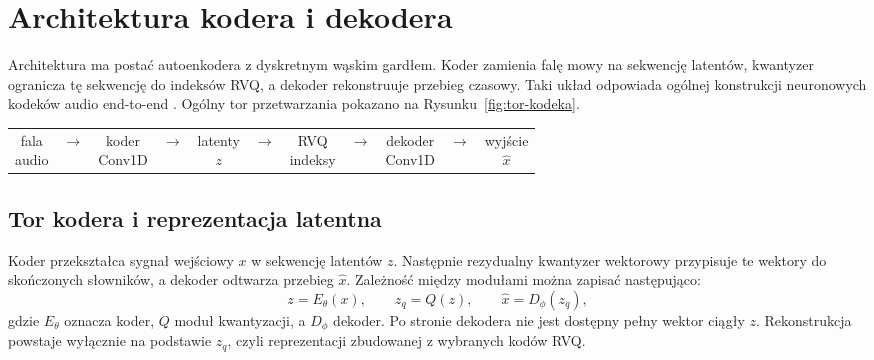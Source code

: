 \section{Architektura kodera i dekodera}
\label{sec:architektura-kodera-dekodera}

Architektura ma postać autoenkodera z dyskretnym wąskim gardłem. Koder zamienia falę mowy na sekwencję latentów, kwantyzer ogranicza tę sekwencję do indeksów RVQ, a dekoder rekonstruuje przebieg czasowy. Taki układ odpowiada ogólnej konstrukcji neuronowych kodeków audio end-to-end \cite{Zeghidour2021SoundStream,Defossez2022Encodec}. Ogólny tor przetwarzania pokazano na Rysunku~\ref{fig:tor-kodeka}.

\begin{center}
\centering
\footnotesize
\setlength{\tabcolsep}{2pt}
\begin{tabular}{c c c c c c c c c c c}
\fbox{\parbox{0.092\textwidth}{\centering fala\\audio}} &
\(\rightarrow\) &
\fbox{\parbox{0.092\textwidth}{\centering koder\\Conv1D}} &
\(\rightarrow\) &
\fbox{\parbox{0.092\textwidth}{\centering latenty\\\(z\)}} &
\(\rightarrow\) &
\fbox{\parbox{0.092\textwidth}{\centering RVQ\\indeksy}} &
\(\rightarrow\) &
\fbox{\parbox{0.092\textwidth}{\centering dekoder\\Conv1D}} &
\(\rightarrow\) &
\fbox{\parbox{0.092\textwidth}{\centering wyjście\\\(\hat{x}\)}} \\
\end{tabular}
\label{fig:tor-kodeka}
\end{center}

\subsection{Tor kodera i reprezentacja latentna}

Koder przekształca sygnał wejściowy \(x\) w sekwencję latentów \(z\). Następnie rezydualny kwantyzer wektorowy przypisuje te wektory do skończonych słowników, a dekoder odtwarza przebieg \(\hat{x}\). Zależność między modułami można zapisać następująco:
\[
z = E_\theta(x), \qquad z_q = Q(z), \qquad \hat{x} = D_\phi(z_q),
\]
gdzie \(E_\theta\) oznacza koder, \(Q\) moduł kwantyzacji, a \(D_\phi\) dekoder. Po stronie dekodera nie jest dostępny pełny wektor ciągły \(z\). Rekonstrukcja powstaje wyłącznie na podstawie \(z_q\), czyli reprezentacji zbudowanej z wybranych kodów RVQ.

